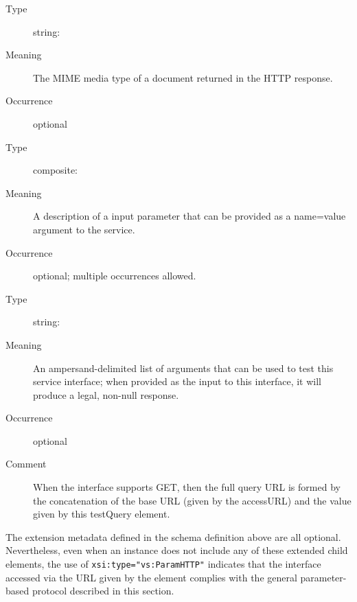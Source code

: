 \documentclass[11pt,a4paper]{ivoa}
\begin{document}
\begin{generated}
\begin{bigdescription}
\begin{description}
\end{description}
\item[Element \xmlel{resultType}]
\begin{description}
\item[Type] string: 
\item[Meaning] The MIME media type of a document returned in
                       the HTTP response.
\item[Occurrence] optional

\end{description}
\item[Element \xmlel{param}]
\begin{description}
\item[Type] composite: 
\item[Meaning] A description of a input parameter that can be
                       provided as a name=value argument to the service.
\item[Occurrence] optional; multiple occurrences allowed.

\end{description}
\item[Element \xmlel{testQuery}]
\begin{description}
\item[Type] string: 
\item[Meaning] An ampersand-delimited list of arguments that
                       can be used to test this service interface;
                       when provided as the input to this interface,
                       it will produce a legal, non-null response.
\item[Occurrence] optional
\item[Comment] When the interface supports GET, then the full
                       query URL is formed by the concatenation of the
                       base URL (given by the accessURL) and the value
                       given by this testQuery element.

\end{description}


\end{bigdescription}\endgroup

\endgroup
\end{generated}


The extension metadata defined in the schema definition above are all
optional.  Nevertheless, even when an 
instance does not include any of these extended child elements, the
use of \verb|xsi:type="vs:ParamHTTP"| indicates that the interface
accessed via the URL given by the 
element complies with the general parameter-based protocol described
in this section.
\end{document}
